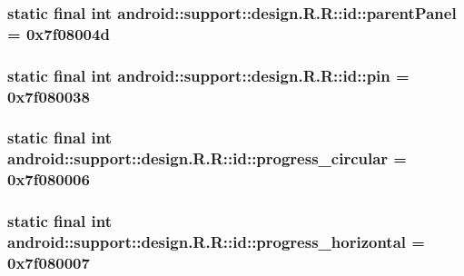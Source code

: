 \hypertarget{classandroid_1_1support_1_1design_1_1_r_1_1id_06cf22c9a3f15fdf4ee5364e623ea40b}{
\subsubsection[{parentPanel}]{\setlength{\rightskip}{0pt plus 5cm}static final int android::support::design.R.R::id::parentPanel = 0x7f08004d}}
\label{classandroid_1_1support_1_1design_1_1_r_1_1id_06cf22c9a3f15fdf4ee5364e623ea40b}


\hypertarget{classandroid_1_1support_1_1design_1_1_r_1_1id_7c35a704785436346b67e050d4b8aceb}{
\subsubsection[{pin}]{\setlength{\rightskip}{0pt plus 5cm}static final int android::support::design.R.R::id::pin = 0x7f080038}}
\label{classandroid_1_1support_1_1design_1_1_r_1_1id_7c35a704785436346b67e050d4b8aceb}


\hypertarget{classandroid_1_1support_1_1design_1_1_r_1_1id_1e15921347c1872445317aa755b5873a}{
\subsubsection[{progress\_\-circular}]{\setlength{\rightskip}{0pt plus 5cm}static final int android::support::design.R.R::id::progress\_\-circular = 0x7f080006}}
\label{classandroid_1_1support_1_1design_1_1_r_1_1id_1e15921347c1872445317aa755b5873a}


\hypertarget{classandroid_1_1support_1_1design_1_1_r_1_1id_e666171ed206e7b071cbdfb2d2039595}{
\subsubsection[{progress\_\-horizontal}]{\setlength{\rightskip}{0pt plus 5cm}static final int android::support::design.R.R::id::progress\_\-horizontal = 0x7f080007}}
\label{classandroid_1_1support_1_1design_1_1_r_1_1id_e666171ed206e7b071cbdfb2d2039595}


